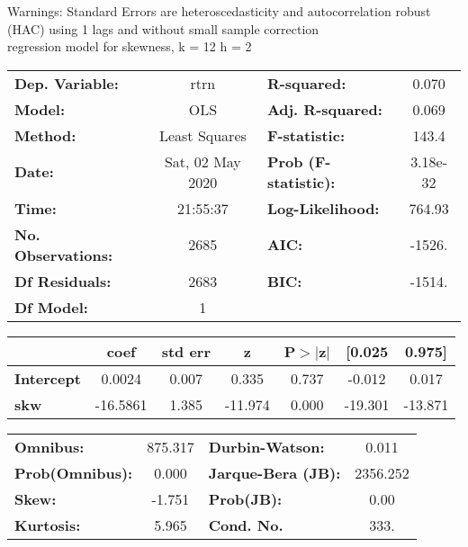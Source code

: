 Warnings: \newline
 [1] Standard Errors are heteroscedasticity and autocorrelation robust (HAC) using 1 lags and without small sample correction\\ 

regression model for skewness, k = 12 h = 2\begin{center}
\begin{tabular}{lclc}
\toprule
\textbf{Dep. Variable:}    &       rtrn       & \textbf{  R-squared:         } &     0.070   \\
\textbf{Model:}            &       OLS        & \textbf{  Adj. R-squared:    } &     0.069   \\
\textbf{Method:}           &  Least Squares   & \textbf{  F-statistic:       } &     143.4   \\
\textbf{Date:}             & Sat, 02 May 2020 & \textbf{  Prob (F-statistic):} &  3.18e-32   \\
\textbf{Time:}             &     21:55:37     & \textbf{  Log-Likelihood:    } &    764.93   \\
\textbf{No. Observations:} &        2685      & \textbf{  AIC:               } &    -1526.   \\
\textbf{Df Residuals:}     &        2683      & \textbf{  BIC:               } &    -1514.   \\
\textbf{Df Model:}         &           1      & \textbf{                     } &             \\
\bottomrule
\end{tabular}
\begin{tabular}{lcccccc}
                   & \textbf{coef} & \textbf{std err} & \textbf{z} & \textbf{P$> |$z$|$} & \textbf{[0.025} & \textbf{0.975]}  \\
\midrule
\textbf{Intercept} &       0.0024  &        0.007     &     0.335  &         0.737        &       -0.012    &        0.017     \\
\textbf{skw}       &     -16.5861  &        1.385     &   -11.974  &         0.000        &      -19.301    &      -13.871     \\
\bottomrule
\end{tabular}
\begin{tabular}{lclc}
\textbf{Omnibus:}       & 875.317 & \textbf{  Durbin-Watson:     } &    0.011  \\
\textbf{Prob(Omnibus):} &   0.000 & \textbf{  Jarque-Bera (JB):  } & 2356.252  \\
\textbf{Skew:}          &  -1.751 & \textbf{  Prob(JB):          } &     0.00  \\
\textbf{Kurtosis:}      &   5.965 & \textbf{  Cond. No.          } &     333.  \\
\bottomrule
\end{tabular}
\end{center}

